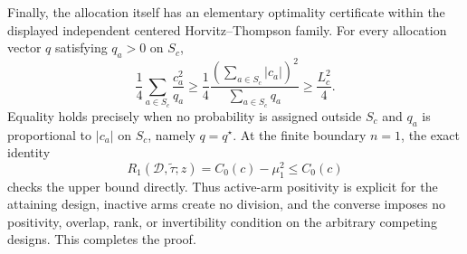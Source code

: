 Finally, the allocation itself has an elementary optimality certificate
within the displayed independent centered Horvitz--Thompson family.  For
every allocation vector \(q\) satisfying \(q_a>0\) on \(S_c\),
\[
 \frac14\sum_{a\in S_c}\frac{c_a^2}{q_a}
 \ge
 \frac14\frac{(\sum_{a\in S_c}|c_a|)^2}
 {\sum_{a\in S_c}q_a}
 \ge\frac{L_c^2}{4}.
\]
Equality holds precisely when no probability is assigned outside \(S_c\)
and \(q_a\) is proportional to \(|c_a|\) on \(S_c\), namely
\(q=q^\star\).  At the finite boundary \(n=1\), the exact identity
\[
 R_1(\mathcal D,\widetilde\tau;z)=C_0(c)-\mu_1^2\le C_0(c)
\]
checks the upper bound directly.  Thus active-arm positivity is explicit
for the attaining design, inactive arms create no division, and the
converse imposes no positivity, overlap, rank, or invertibility condition
on the arbitrary competing designs.  This completes the proof.